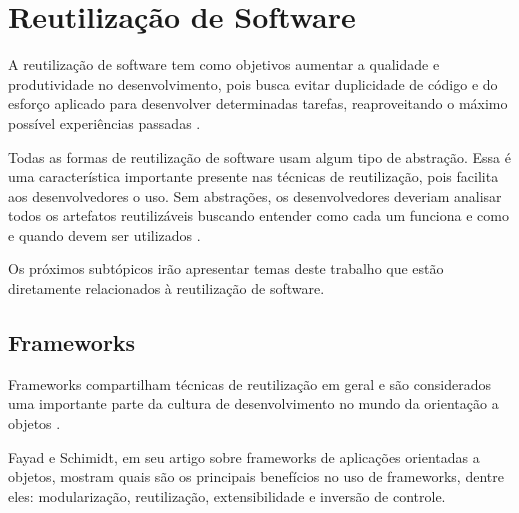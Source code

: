 \section{Reutilização de Software}

A reutilização de software tem como objetivos aumentar a qualidade e produtividade no desenvolvimento, pois busca evitar duplicidade de código e do esforço aplicado para desenvolver determinadas tarefas, reaproveitando o máximo possível experiências passadas \cite{Lucredio:2009}.

Todas as formas de reutilização de software usam algum tipo de abstração.  Essa é uma característica importante presente nas técnicas de reutilização, pois facilita aos desenvolvedores o uso. Sem abstrações, os desenvolvedores deveriam analisar todos os artefatos reutilizáveis buscando entender como cada um funciona e como e quando devem ser utilizados \cite{Krueger:1992}.

Os próximos subtópicos irão apresentar temas deste trabalho que estão diretamente relacionados à reutilização de software.

\subsection{Frameworks}

Frameworks compartilham técnicas de reutilização em geral e são considerados uma importante parte da cultura de desenvolvimento no mundo da orientação a objetos \cite{Johnson:1997}.

Fayad e Schimidt, em seu artigo \cite{Fayad:Schimidt:1997} sobre frameworks de aplicações orientadas a objetos, mostram quais são os principais benefícios no uso de frameworks, dentre eles: modularização, reutilização, extensibilidade e inversão de controle.

